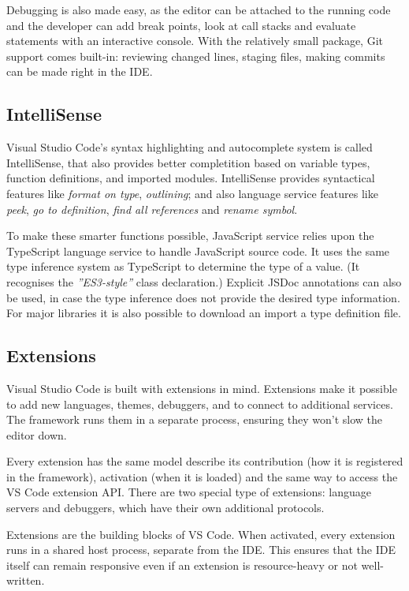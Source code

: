 Debugging is also made easy, as the editor can be attached to the running code and the developer can add break points, look at call stacks and evaluate statements with an interactive console. With the relatively small package, Git support comes built-in: reviewing changed lines, staging files, making commits can be made right in the IDE.

\subsection{IntelliSense}
Visual Studio Code's syntax highlighting and autocomplete system is called IntelliSense, that also provides better completition based on variable types, function definitions, and imported modules. IntelliSense provides syntactical features like \emph{format on type}, \emph{outlining}; and also language service features like \emph{peek}, \emph{go to definition}, \emph{find all references} and \emph{rename symbol}.

To make these smarter functions possible, JavaScript service relies upon the TypeScript language service to handle JavaScript source code. It uses the same type inference system as TypeScript to determine the type of a value. (It recognises the \emph{''ES3-style''} class declaration.) Explicit JSDoc annotations can also be used, in case the type inference does not provide the desired type information. For major libraries it is also possible to download an import a type definition file.

\subsection{Extensions}
Visual Studio Code is built with extensions in mind. Extensions make it possible to add new languages, themes, debuggers, and to connect to additional services. The framework runs them in a separate process, ensuring they won't slow the editor down.

Every extension has the same model describe its contribution (how it is registered in the framework), activation (when it is loaded) and the same way to access the VS Code extension API. There are two special type of extensions: language servers and debuggers, which have their own additional protocols.

Extensions are the building blocks of VS Code. When activated, every extension runs in a shared host process, separate from the IDE. This ensures that the IDE itself can remain responsive even if an extension is resource-heavy or not well-written.

